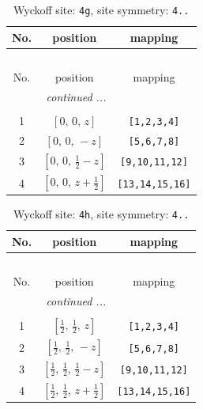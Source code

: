 \documentclass[fleqn,8pt]{jsarticle}
\begin{document}
\renewcommand{\arraystretch}{1.2}
\begin{longtable}{ccc}
\caption{Wyckoff site: {\tt 4g}, site symmetry: {\tt 4..}}
 \\
 \hline \hline
No. & position & mapping \\ \hline \endfirsthead

\multicolumn{2}{l}{\tablename\ \thetable{}} \\
 \hline \hline
No. & position & mapping \\ \hline \endhead

 \hline \hline
\multicolumn{2}{r}{\footnotesize\it continued ...} \\ \endfoot

 \hline \hline
\multicolumn{2}{r}{} \\ \endlastfoot

1 & $\left[ 0,\, 0,\, z \right]$ & {\tt [1,2,3,4]} \\ \hline
2 & $\left[ 0,\, 0,\, - z \right]$ & {\tt [5,6,7,8]} \\ \hline
3 & $\left[ 0,\, 0,\, \frac{1}{2} - z \right]$ & {\tt [9,10,11,12]} \\ \hline
4 & $\left[ 0,\, 0,\, z + \frac{1}{2} \right]$ & {\tt [13,14,15,16]} \\
\end{longtable}
\renewcommand{\arraystretch}{1.2}
\begin{longtable}{ccc}
\caption{Wyckoff site: {\tt 4h}, site symmetry: {\tt 4..}}
 \\
 \hline \hline
No. & position & mapping \\ \hline \endfirsthead

\multicolumn{2}{l}{\tablename\ \thetable{}} \\
 \hline \hline
No. & position & mapping \\ \hline \endhead

 \hline \hline
\multicolumn{2}{r}{\footnotesize\it continued ...} \\ \endfoot

 \hline \hline
\multicolumn{2}{r}{} \\ \endlastfoot

1 & $\left[ \frac{1}{2},\, \frac{1}{2},\, z \right]$ & {\tt [1,2,3,4]} \\ \hline
2 & $\left[ \frac{1}{2},\, \frac{1}{2},\, - z \right]$ & {\tt [5,6,7,8]} \\ \hline
3 & $\left[ \frac{1}{2},\, \frac{1}{2},\, \frac{1}{2} - z \right]$ & {\tt [9,10,11,12]} \\ \hline
4 & $\left[ \frac{1}{2},\, \frac{1}{2},\, z + \frac{1}{2} \right]$ & {\tt [13,14,15,16]} \\
\end{longtable}
\end{document}
